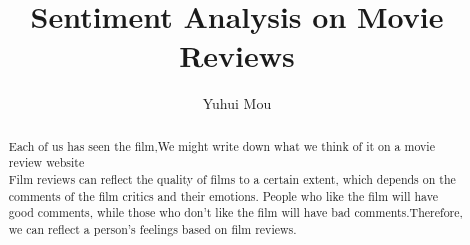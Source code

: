 \documentclass[sigconf]{acmart}
\begin{document}
%
%
\title{Sentiment Analysis on Movie Reviews}%


\author{Yuhui Mou}


\renewcommand{\shortauthors}{G. Li et al.}


\begin{abstract}
  Each of us has seen the film,We might write down what we think of it on a movie review website \\
  Film reviews can reflect the quality of films to a certain extent, which depends on the comments of 
  the film critics and their emotions. People who like the film will have good comments,
  while those who don't like the film will have bad comments.Therefore, we can reflect a
   person's feelings based on film reviews.
\end{abstract}

\maketitle



% 
% 
\end{document}
